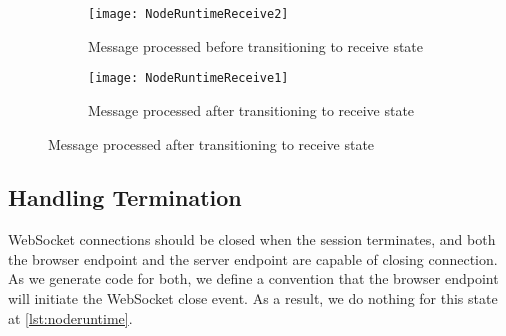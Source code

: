 \begin{figure}[!ht]
\centering
\begin{subfigure}[b]{0.8\textwidth}
\centering
\texttt{[image: NodeRuntimeReceive2]}
\caption{Message processed before transitioning to receive state}
\label{subfig:nodereceivemsgfirst}
\end{subfigure}
\hfill
\begin{subfigure}[b]{0.8\textwidth}
\centering
\texttt{[image: NodeRuntimeReceive1]}
\caption{Message processed after transitioning to receive state}
\label{subfig:nodereceivehandlefirst}
\end{subfigure}
\label{fig:nodereceivecompare}
\end{figure}

\subsection{Handling Termination}
WebSocket connections should be closed when the session terminates,
and both the browser endpoint and the server endpoint are capable
of closing connection. As we generate code for both, we define
a convention that the browser endpoint will initiate the WebSocket
close event.
As a result, we do nothing for this state at \cref{lst:noderuntime}.